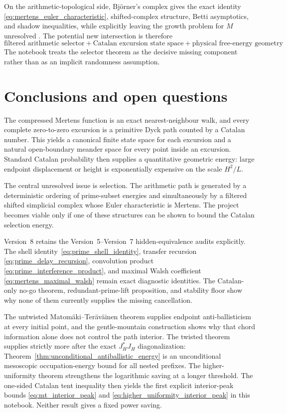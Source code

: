 \documentclass[11pt]{amsart}
\numberwithin{equation}{section}
\theoremstyle{plain}
\theoremstyle{definition}
\theoremstyle{remark}
\newcommand{\Mert}{M}
\begin{document}
On the arithmetic-topological side, Bj\"orner's complex gives the exact identity \eqref{eq:mertens_euler_characteristic}, shifted-complex structure, Betti asymptotics, and shadow inequalities, while explicitly leaving the growth problem for $\Mert$ unresolved \cite{Bjorner2011}.  The potential new intersection is therefore
\begin{equation}
\boxed{
\text{filtered arithmetic selector}
+
\text{Catalan excursion state space}
+
\text{physical free-energy geometry}
}.
\label{eq:literature_intersection}
\end{equation}
The notebook treats the selector theorem as the decisive missing component rather than as an implicit randomness assumption.

\section{Conclusions and open questions}
\label{sec:conclusions}

The compressed Mertens function is an exact nearest-neighbour walk, and every complete zero-to-zero excursion is a primitive Dyck path counted by a Catalan number.  This yields a canonical finite state space for each excursion and a natural open-boundary meander space for every point inside an excursion.  Standard Catalan probability then supplies a quantitative geometric energy: large endpoint displacement or height is exponentially expensive on the scale $H^2/L$.

The central unresolved issue is selection.  The arithmetic path is generated by a deterministic ordering of prime-subset energies and simultaneously by a filtered shifted simplicial complex whose Euler characteristic is Mertens.  The project becomes viable only if one of these structures can be shown to bound the Catalan selection energy.

Version~8 retains the Version~5--Version~7 hidden-equivalence audits
explicitly.  The shell
identity~\eqref{eq:prime_shell_identity}, transfer recursion
\eqref{eq:prime_delay_recursion}, convolution product
\eqref{eq:prime_interference_product}, and maximal Walsh coefficient
\eqref{eq:mertens_maximal_walsh} remain exact diagnostic identities.  The
Catalan-only no-go theorem, redundant-prime-lift proposition, and stability
floor show why none of them currently supplies the missing cancellation.

The untwisted Matom\"aki--Ter\"av\"ainen theorem supplies endpoint
anti-ballisticism at every initial point, and the gentle-mountain construction
shows why that chord information alone does not control the path interior.
The twisted theorem supplies strictly more after the exact $J_H^*J_H$
diagonalization: Theorem~\ref{thm:unconditional_antiballistic_energy} is an
unconditional mesoscopic occupation-energy bound for all nested prefixes.
The higher-uniformity theorem strengthens the logarithmic saving at a longer
threshold.  The one-sided Catalan tent inequality then yields the first
explicit interior-peak bounds \eqref{eq:mt_interior_peak} and
\eqref{eq:higher_uniformity_interior_peak} in this notebook.  Neither result
gives a fixed power saving.
\end{document}
